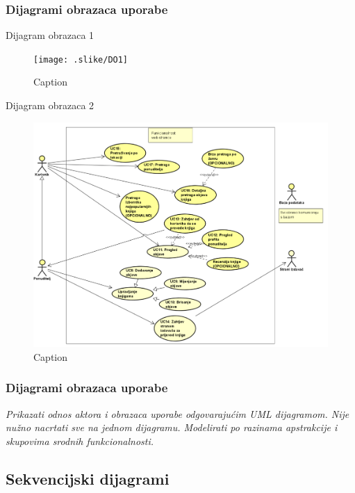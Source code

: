 				\subsubsection{Dijagrami obrazaca uporabe}
					
Dijagram obrazaca 1

\begin{figure}
    \centering
    \texttt{[image: .slike/DO1]}
    \caption{Caption}
    \label{fig:enter-label}
\end{figure}

Dijagram obrazaca 2

\begin{figure}
    \centering
    \includegraphics[width = \textwidth]{slike/DO2}
    \caption{Caption}
    \label{fig:enter-label}
\end{figure}
				\eject	
					
				\subsubsection{Dijagrami obrazaca uporabe}
					
					\textit{Prikazati odnos aktora i obrazaca uporabe odgovarajućim UML dijagramom. Nije nužno nacrtati sve na jednom dijagramu. Modelirati po razinama apstrakcije i skupovima srodnih funkcionalnosti.}
				\eject		
				
			\subsection{Sekvencijski dijagrami}
				

